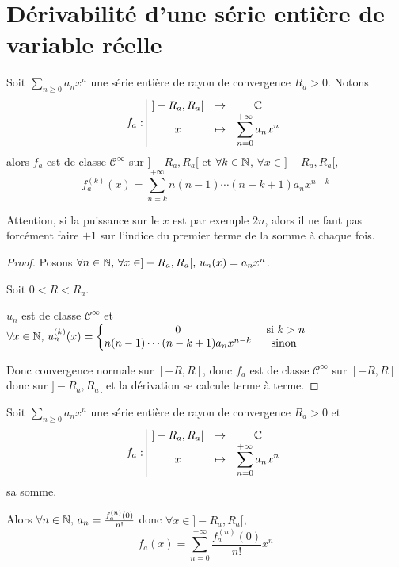 \section{Dérivabilité d'une série entière de variable réelle }


\lvspace \avspace \begin{theoreme}{}{}
    Soit $\sum_{n \geqslant 0} a_n x^n$ une série entière de rayon de convergence $R_a > 0$.
    Notons $$f_a: \space \begin{array}{|ccc} \displaystyle ]-R_a, R_a[ & \to & \displaystyle \mathbb{C} \\ \displaystyle x & \mapsto & \displaystyle \sum_{n = 0}^{+\infty} a_n x^n \end{array}$$ alors 
    $f_a$ est de classe $\mathscr {C}^\infty$ sur $]-R_a, R_a[$ et 
    $\forall k \in \mathbb{N}$, $\forall x \in ]-R_a, R_a[$,
    $$f^{(k)}_a(x) = \sum_{n = k}^{+\infty} n (n - 1) \cdots (n - k + 1) a_n x^{n - k}$$
\end{theoreme}


\begin{remarque}
    Attention, si la puissance sur le $x$ est par exemple $2n$, alors il ne faut pas forcément 
    faire $+1$ sur l'indice du premier terme de la somme à chaque fois. 
\end{remarque}

\begin{proof}
    Posons $\forall n \in \mathbb{N}, \, \forall x \in ]-R_a, R_a[, \, u_n(x) = a_n x^n$.

    Soit $0 < R < R_a$. 

    $u_n $ est de classe $\mathscr {C}^\infty$ et $\forall x \in \mathbb{N}, \, u_n^{(k)}(x) = \left\{ \begin{matrix}
        0 & \text{ si } k > n \\
        n(n- 1) \cdots (n - k + 1) a_n x^{n - k} & \text{ sinon }
    \end{matrix} \right.$ 

    Donc convergence normale sur $[-R, R]$, donc $f_a$ est de classe $\mathscr {C}^\infty$ 
    sur $[-R, R]$ donc sur $]-R_a, R_a[$ et la dérivation se calcule terme à terme.
\end{proof}

\begin{corollaire}{}{}
    Soit $\sum_{n \geqslant 0} a_n x^n$ une série entière de rayon de convergence $R_a > 0$ 
    et $$f_a: \space \begin{array}{|ccc} \displaystyle ]-R_a, R_a[ & \to & \displaystyle \mathbb{C} \\ \displaystyle x & \mapsto & \displaystyle \sum_{n = 0}^{+\infty} a_n x^n \end{array}$$ sa somme. 

    Alors $\forall n \in \mathbb{N}, \, a_n = \frac{f_a^{(n)}(0)}{n!}$ donc 
    $\forall x \in ]-R_a, R_a[$, 
    $$f_a(x) = \sum_{n = 0}^{+\infty} \frac{f_a^{(n)}(0)}{n!} x^n$$
\end{corollaire}

